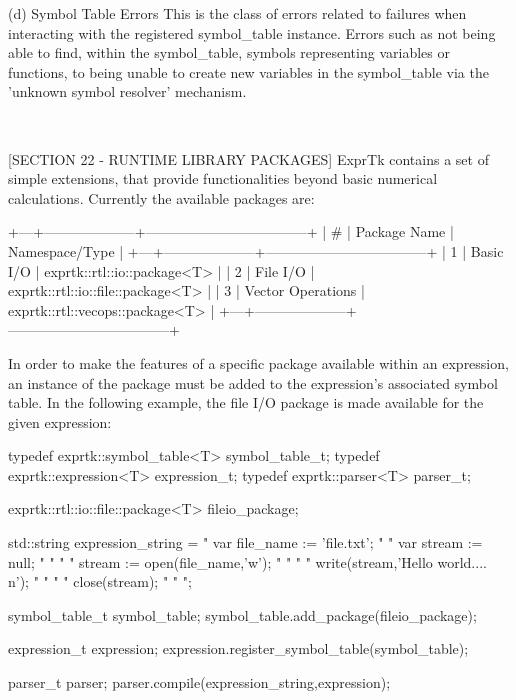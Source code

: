 {(d) Symbol Table Errors
This is the class of errors related to failures when interacting  with
the registered symbol\_table instance. Errors such as not being able to
find,  within  the  symbol\_table,  symbols  representing  variables or
functions, to being unable to create new variables in the symbol\_table
via the 'unknown symbol resolver' mechanism.

~~~~~~~~~~~~~~~~~~~~~~~~~~~~~~~~~~~~~~~~~~~~~~~~~~~~~~~~~~

[SECTION 22 - RUNTIME LIBRARY PACKAGES]
ExprTk   contains   a   set  of   simple   extensions,   that  provide
functionalities  beyond  basic numerical  calculations.  Currently the
available packages are:

+---+--------------------+-----------------------------------+
| \# |    Package Name    |          Namespace/Type           |
+---+--------------------+-----------------------------------+
| 1 | Basic I/O          | exprtk::rtl::io::package<T>       |
| 2 | File I/O           | exprtk::rtl::io::file::package<T> |
| 3 | Vector Operations  | exprtk::rtl::vecops::package<T>   |
+---+--------------------+-----------------------------------+


In order to make the  features of a specific package  available within
an  expression,  an instance  of  the package  must  be added  to  the
expression's associated  symbol table.  In the  following example, the
file I/O package is made available for the given expression:

typedef exprtk::symbol\_table<T> symbol\_table\_t;
typedef exprtk::expression<T>     expression\_t;
typedef exprtk::parser<T>             parser\_t;

exprtk::rtl::io::file::package<T> fileio\_package;

std::string expression\_string =
" var file\_name := 'file.txt';        "
" var stream    := null;              "
"                                     "
" stream := open(file\_name,'w');      "
"                                     "
" write(stream,'Hello world....\\n');  "
"                                     "
" close(stream);                      "
"                                     ";

symbol\_table\_t symbol\_table;
symbol\_table.add\_package(fileio\_package);

expression\_t expression;
expression.register\_symbol\_table(symbol\_table);

parser\_t parser;
parser.compile(expression\_string,expression);

}
